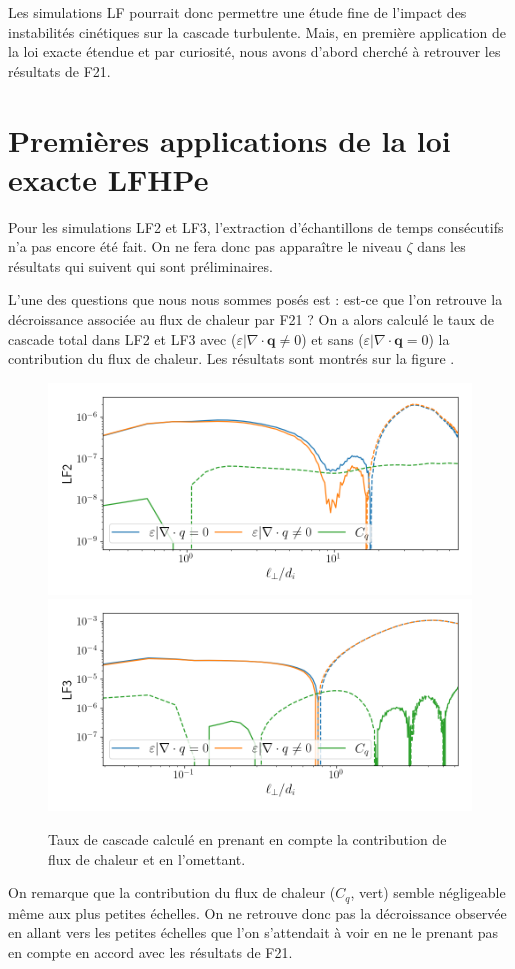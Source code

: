 Les simulations LF pourrait donc permettre une étude fine de l'impact des instabilités cinétiques sur la cascade turbulente. Mais, en première application de la loi exacte étendue et par curiosité, nous avons d'abord cherché à retrouver les résultats de \ac{F21}. 



\section{Premières applications de la loi exacte \acs{LFHPe}}
\label{sec-343}

Pour les simulations LF2 et LF3, l'extraction d'échantillons de temps consécutifs n'a pas encore été fait. On ne fera donc pas apparaître le niveau $\zeta$ dans les résultats qui suivent qui sont préliminaires.

L'une des questions que nous nous sommes posés est : est-ce que l'on retrouve la décroissance associée au flux de chaleur par \ac{F21} ? On a alors calculé le taux de cascade total dans LF2 et LF3 avec ($\varepsilon|\nabla \cdot \boldsymbol{q} \neq 0$) et sans ($\varepsilon|\nabla \cdot \boldsymbol{q} = 0$) la contribution du flux de chaleur. Les résultats sont montrés sur la figure .
\begin{figure}[!ht]
 \centering
\includegraphics[width=0.9\linewidth,trim=1cm 1cm 0cm 1cm, clip=true]{./Part_3/images_ch4/LF2_q}
\includegraphics[width=0.9\linewidth,trim=1cm 1cm 0cm 1cm, clip=true]{./Part_3/images_ch4/LF3_q}
\cprotect\caption{Taux de cascade calculé en prenant en compte la contribution de flux de chaleur et en l'omettant.}
\label{fig:LF_q}
\end{figure} 
On remarque que la contribution du flux de chaleur ($C_q$, vert) semble négligeable même aux plus petites échelles. On ne retrouve donc pas la décroissance observée en allant vers les petites échelles que l'on s'attendait à voir en ne le prenant pas en compte en accord avec les résultats de \ac{F21}.

